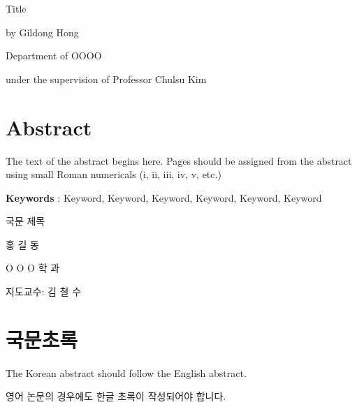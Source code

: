\documentclass[11pt]{report}
\numberwithin{figure}{section}
\theoremstyle{plain}
\theoremstyle{definition}
\theoremstyle{corollary}
\theoremstyle{definition}
\theoremstyle{plain}
\theoremstyle{definition}
\theoremstyle{plain}
\begin{document}
\newpage
{}
\begin{center}
\LARGE Title
\par\vspace{20pt}
\doublespacing
\normalsize by Gildong Hong\par
Department of OOOO\par
under the supervision of Professor Chulsu Kim

\par\vspace{20pt}
\section*{Abstract}
\end{center}

\justifying %
\doublespacing
\normalsize
The text of the abstract begins here. 
Pages should be assigned from the abstract using small Roman numericals (i, ii, iii, iv, v, etc.)
\par\vspace{10pt}

\textbf{Keywords} : Keyword, Keyword, Keyword, Keyword, Keyword, Keyword

\newpage
\begin{center}
\LARGE 국문 제목
\par\vspace{20pt}
\normalsize 홍 길 동\par
O O O 학 과\par
지도교수: 김 철 수

\par\vspace{20pt}
\section*{국문초록}

\end{center}
\normalsize
The Korean abstract should follow the English abstract. \par
영어 논문의 경우에도 한글 초록이 작성되어야 합니다.
\end{document}

